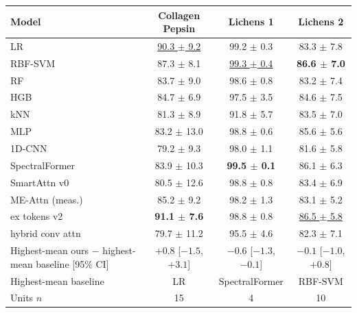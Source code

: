 \small
\begin{tabular}{lccc}
\toprule
Model & Collagen Pepsin & Lichens 1 & Lichens 2 \\
\midrule
LR & \underline{90.3 $\pm$ 9.2} & 99.2 $\pm$ 0.3 & 83.3 $\pm$ 7.8 \\
RBF-SVM & 87.3 $\pm$ 8.1 & \underline{99.3 $\pm$ 0.4} & \textbf{86.6 $\pm$ 7.0} \\
RF & 83.7 $\pm$ 9.0 & 98.6 $\pm$ 0.8 & 83.2 $\pm$ 7.4 \\
HGB & 84.7 $\pm$ 6.9 & 97.5 $\pm$ 3.5 & 84.6 $\pm$ 7.5 \\
kNN & 81.3 $\pm$ 8.9 & 91.8 $\pm$ 5.7 & 83.5 $\pm$ 7.0 \\
MLP & 83.2 $\pm$ 13.0 & 98.8 $\pm$ 0.6 & 85.6 $\pm$ 5.6 \\
1D-CNN & 79.2 $\pm$ 9.3 & 98.0 $\pm$ 1.1 & 81.6 $\pm$ 5.8 \\
SpectralFormer & 83.9 $\pm$ 10.3 & \textbf{99.5 $\pm$ 0.1} & 86.1 $\pm$ 6.3 \\
\midrule
SmartAttn v0 & 80.5 $\pm$ 12.6 & 98.8 $\pm$ 0.8 & 83.4 $\pm$ 6.9 \\
ME-Attn (meas.) & 85.2 $\pm$ 9.2 & 98.2 $\pm$ 1.3 & 83.1 $\pm$ 5.2 \\
ex tokens v2 & \textbf{91.1 $\pm$ 7.6} & 98.8 $\pm$ 0.8 & \underline{86.5 $\pm$ 5.8} \\
hybrid conv attn & 79.7 $\pm$ 11.2 & 95.5 $\pm$ 4.6 & 82.3 $\pm$ 7.1 \\
\midrule
Highest-mean ours $-$ highest-mean baseline [95\% CI] & $+0.8$ [$-1.5$, $+3.1$] & $-0.6$ [$-1.3$, $-0.1$] & $-0.1$ [$-1.0$, $+0.8$] \\
Highest-mean baseline & LR & SpectralFormer & RBF-SVM \\
\midrule
Units $n$ & 15 & 4 & 10 \\
\bottomrule
\end{tabular}
